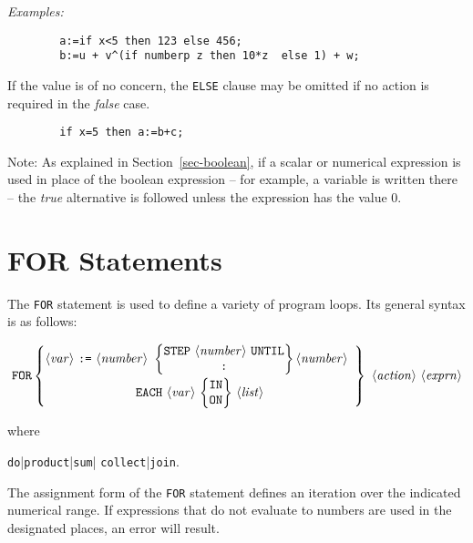 \textit{Examples:}
\begin{verbatim}
        a:=if x<5 then 123 else 456;
        b:=u + v^(if numberp z then 10*z  else 1) + w;
\end{verbatim}
If the value is of no concern, the \texttt{ELSE} clause may be omitted if no
action is required in the \emph{false} case.
\begin{verbatim}
        if x=5 then a:=b+c;
\end{verbatim}
Note:  As explained in Section~\ref{sec-boolean},
if a scalar or numerical expression is used in place of
the boolean expression -- for example, a variable is written there -- the
\emph{true} alternative is followed unless the expression has the value 0.

\section{FOR Statements}
\hypertarget{command:FOR}{}
\hypertarget{command:FOREACH}{}
\hypertarget{reserved:IN}{}
\hypertarget{reserved:DO}{}
\hypertarget{reserved:SUM}{}
\hypertarget{reserved:PRODUCT}{}

The \texttt{FOR} statement
is used to define a variety of program
loops.  Its general syntax is as follows:
\begin{small}
\[ \mbox{\texttt{FOR}} \left\{ \begin{array}{@{}ccc@{}}
    \mbox{\meta{var} \texttt{:=} \meta{number} } \left\{ \begin{array}{@{}c@{}}
    \mbox{\texttt{STEP} \meta{number} \texttt{UNTIL}} \\
    \mbox{\texttt{:}}
    \end{array}
    \right\} \mbox{\meta{number}} \\[3mm]
    \multicolumn{1}{c}{\mbox{\texttt{EACH} \meta{var}
       \(\left\{
          \begin{tabular}{@{}c@{}}
              \texttt{IN} \\ \texttt{ON}
          \end{tabular}
       \right\}\)
       \meta{list}}}
    \end{array}
    \right\} \mbox{ \meta{action} \meta{exprn}} \]
\end{small}%
%
where
\begin{syntax}
      \bnfprod \texttt{do}|\texttt{product}|\texttt{sum}|
                            \texttt{collect}|\texttt{join}.
\end{syntax}
The assignment form of the \texttt{FOR} statement defines an
iteration over the indicated numerical range.  If expressions that do not
evaluate to numbers are used in the designated places, an error will
result.


